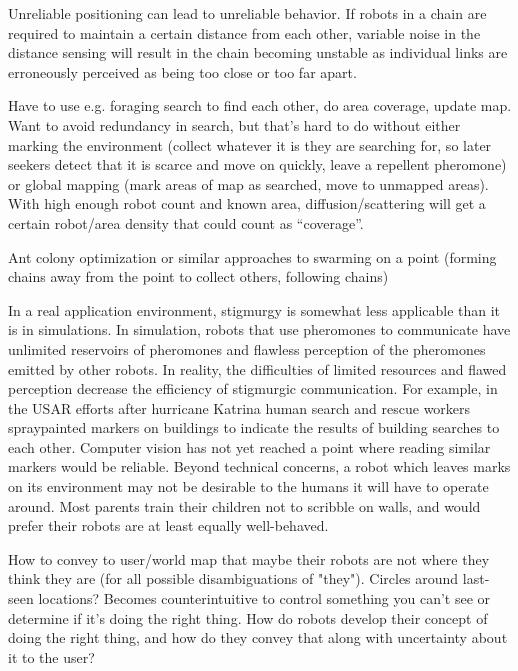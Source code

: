 \documentclass[]{article}
\begin{document}
Unreliable positioning can lead to unreliable behavior. 
If robots in a chain are required to maintain a certain distance from each other, variable noise in the distance sensing will result in the chain becoming unstable as individual links are erroneously perceived as being too close or too far apart. 

Have to use e.g. foraging search to find each other, do area coverage, update map. Want to avoid redundancy in search, but that's hard to do without either marking the environment (collect whatever it is they are searching for, so later seekers detect that it is scarce and move on quickly, leave a repellent pheromone) or global mapping (mark areas of map as searched, move to unmapped areas). With high enough robot count and known area, diffusion/scattering will get a certain robot/area density that could count as ``coverage''. 

Ant colony optimization or similar approaches to swarming on a point (forming chains away from the point to collect others, following chains)

In a real application environment, stigmurgy is somewhat less applicable than it is in simulations. 
In simulation, robots that use pheromones to communicate have unlimited reservoirs of pheromones and flawless perception of the pheromones emitted by other robots. 
In reality, the difficulties of limited resources and flawed perception decrease the efficiency of stigmurgic communication. 
For example, in the USAR efforts after hurricane Katrina human search and rescue workers spraypainted markers on buildings to indicate the results of building searches to each other. 
Computer vision has not yet reached a point where reading similar markers would be reliable. 
Beyond technical concerns, a robot which leaves marks on its environment may not be desirable to the humans it will have to operate around. 
Most parents train their children not to scribble on walls, and would prefer their robots are at least equally well-behaved. 

How to convey to user/world map that maybe their robots are not where they think they are (for all possible disambiguations of "they"). Circles around last-seen locations? Becomes counterintuitive to control something you can't see or determine if it's doing the right thing. How do robots develop their concept of doing the right thing, and how do they convey that along with uncertainty about it to the user?




\end{document}
